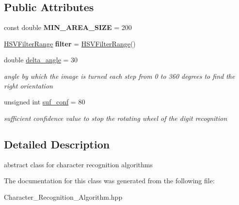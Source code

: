 \subsection*{Public Attributes}
\begin{DoxyCompactItemize}
\item 
\mbox{\label{class_character___recognition___algorithm_a6fda22815d819ef7d0b0cfec4baba47c}} 
const double {\bfseries M\+I\+N\+\_\+\+A\+R\+E\+A\+\_\+\+S\+I\+ZE} = 200
\item 
\mbox{\label{class_character___recognition___algorithm_a3792c162037a2049d991a1634576d915}} 
\mbox{\hyperlink{struct_h_s_v_filter_range}{H\+S\+V\+Filter\+Range}} {\bfseries filter} = \mbox{\hyperlink{struct_h_s_v_filter_range}{H\+S\+V\+Filter\+Range}}()
\item 
\mbox{\label{class_character___recognition___algorithm_a9c22f95223ecc5cfaf8e0303c30d5379}} 
double \mbox{\hyperlink{class_character___recognition___algorithm_a9c22f95223ecc5cfaf8e0303c30d5379}{delta\+\_\+angle}} = 30
\begin{DoxyCompactList}\small\item\em angle by which the image is turned each step from 0 to 360 degrees to find the right orientation \end{DoxyCompactList}\item 
\mbox{\label{class_character___recognition___algorithm_abf3ec6a778fa4d44ffa74c701acebfb0}} 
unsigned int \mbox{\hyperlink{class_character___recognition___algorithm_abf3ec6a778fa4d44ffa74c701acebfb0}{suf\+\_\+conf}} = 80
\begin{DoxyCompactList}\small\item\em sufficient confidence value to stop the rotating wheel of the digit recognition \end{DoxyCompactList}\end{DoxyCompactItemize}


\subsection{Detailed Description}
abstract class for character recognition algorithms 

The documentation for this class was generated from the following file\+:\begin{DoxyCompactItemize}
\item 
Character\+\_\+\+Recognition\+\_\+\+Algorithm.\+hpp\end{DoxyCompactItemize}
